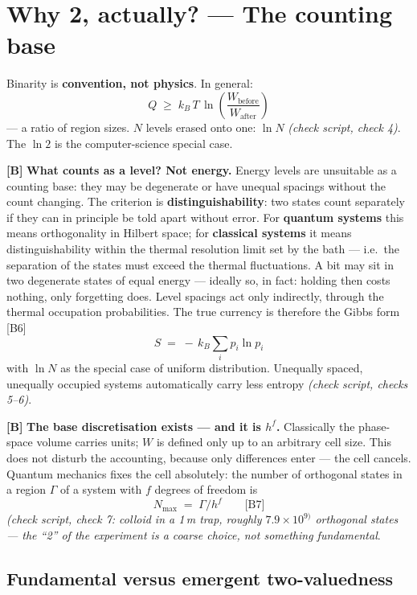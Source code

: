\section{Why 2, actually? --- The counting base}
\label{sec:counting}

Binarity is \textbf{convention, not physics}. In general:
\[
  Q \;\ge\; k_B\,T\,\ln\!\left(\frac{W_{\text{before}}}{W_{\text{after}}}\right)
\]
--- a ratio of region sizes. $N$ levels erased onto one: $\ln N$
\emph{(check script, check 4)}. The $\ln 2$ is the computer-science special case.

\textbf{[B]} \textbf{What counts as a level? Not energy.} Energy levels are unsuitable as a
counting base: they may be degenerate or have unequal spacings without the count
changing. The criterion is \textbf{distinguishability}: two states count
separately if they can in principle be told apart without error. For
\textbf{quantum systems} this means orthogonality in Hilbert space; for
\textbf{classical systems} it means distinguishability within the thermal
resolution limit set by the bath --- i.e.\ the separation of the states must
exceed the thermal fluctuations. A bit may sit in two degenerate states of equal
energy --- ideally so, in fact: holding then costs nothing, only forgetting does.
Level spacings act only indirectly, through the thermal occupation probabilities.
The true currency is therefore the Gibbs form [B6]
\[
  S \;=\; -\,k_B \sum_i p_i \ln p_i
\]
with $\ln N$ as the special case of uniform distribution. Unequally spaced,
unequally occupied systems automatically carry less entropy \emph{(check script, checks 5--6)}.

\textbf{[B]} \textbf{The base discretisation exists --- and it is $h^f$.} Classically the
phase-space volume carries units; $W$ is defined only up to an arbitrary cell
size. This does not disturb the accounting, because only differences enter --- the
cell cancels. Quantum mechanics fixes the cell absolutely: the number of
orthogonal states in a region $\Gamma$ of a system with $f$ degrees of freedom is
\[
  N_{\max} \;=\; \Gamma / h^f \qquad \text{[B7]}
\]
\emph{(check script, check 7: colloid in a 1\,\textmu m trap, roughly $7.9\times10^{9)}$
orthogonal states --- the “2” of the experiment is a coarse choice, not something
fundamental}.

\subsection{Fundamental versus emergent two-valuedness}

